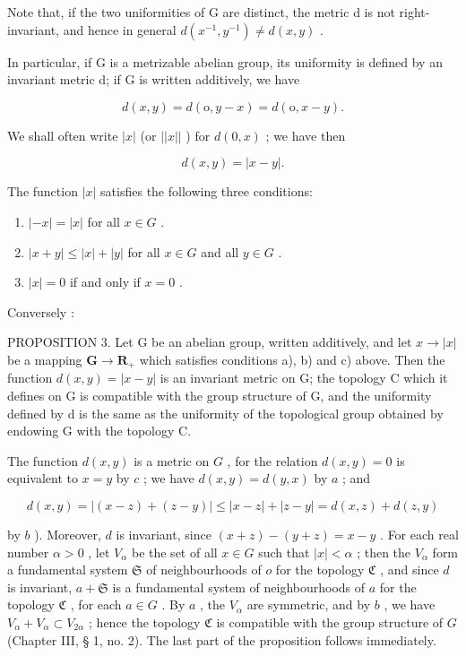 Note that, if the two uniformities of G are distinct, the metric d is not right-invariant, and hence in general \(d(x^{-1}, y^{-1}) \neq d(x, y)\) .

In particular, if G is a metrizable abelian group, its uniformity is defined by an invariant metric d; if G is written additively, we have

\[
d (x, y) = d (\mathrm{o}, y - x) = d (\mathrm{o}, x - y).
\]

We shall often write \(|x|\) (or \(||x||\) ) for \(d(0, x)\) ; we have then

\[
d (x, y) = | x - y |.
\]

The function \(|x|\) satisfies the following three conditions:

\begin{enumerate}
\def\labelenumi{\alph{enumi})}
\item
  \(|-x| = |x|\) for all \(x \in G\) .
\item
  \(|x + y| \leqslant |x| + |y|\) for all \(x \in G\) and all \(y \in G\) .
\item
  \(|x| = 0\) if and only if \(x = 0\) .
\end{enumerate}

Conversely :

PROPOSITION 3. Let G be an abelian group, written additively, and let \(x \to |x|\) be a mapping \(\mathbf{G} \to \mathbf{R}_+\) which satisfies conditions a), b) and c) above. Then the function \(d(x, y) = |x - y|\) is an invariant metric on G; the topology C which it defines on G is compatible with the group structure of G, and the uniformity defined by d is the same as the uniformity of the topological group obtained by endowing G with the topology C.

The function \(d(x, y)\) is a metric on \(G\) , for the relation \(d(x, y) = 0\) is equivalent to \(x = y\) by \(c\) ; we have \(d(x, y) = d(y, x)\) by \(a\) ; and

\[
d (x, y) = | (x - z) + (z - y) | \leqslant | x - z | + | z - y | = d (x, z) + d (z, y)
\]

by \(b\) ). Moreover, \(d\) is invariant, since \((x + z) - (y + z) = x - y\) . For each real number \(\alpha > 0\) , let \(V_{\alpha}\) be the set of all \(x \in G\) such that \(|x| < \alpha\) ; then the \(V_{\alpha}\) form a fundamental system \(\mathfrak{S}\) of neighbourhoods of \(o\) for the topology \(\mathfrak{C}\) , and since \(d\) is invariant, \(a + \mathfrak{S}\) is a fundamental system of neighbourhoods of \(a\) for the topology \(\mathfrak{C}\) , for each \(a \in G\) . By \(a\) , the \(V_{\alpha}\) are symmetric, and by \(b\) , we have \(V_{\alpha} + V_{\alpha} \subset V_{2\alpha}\) ; hence the topology \(\mathfrak{C}\) is compatible with the group structure of \(G\) (Chapter III, § 1, no. 2). The last part of the proposition follows immediately.


